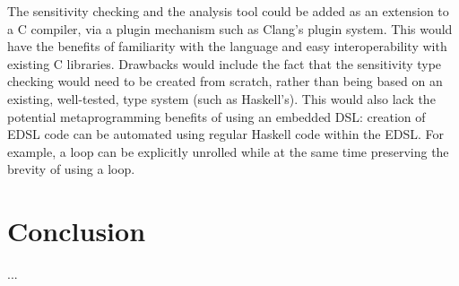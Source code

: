 \documentclass[10pt, conference]{IEEEtran}
\begin{document}
The sensitivity checking and the analysis tool could be added as an extension to
a C compiler, via a plugin mechanism such as Clang's plugin system. This would
have the benefits of familiarity with the language and easy interoperability
with existing C libraries. Drawbacks would include the fact that the sensitivity type
checking would need to be created from scratch, rather than being based on an existing, well-tested,
type system (such as Haskell's). This would also lack the potential metaprogramming
benefits of using an embedded DSL: creation of EDSL code can be automated using
regular Haskell code within the EDSL. For example, a loop can be explicitly unrolled while
at the same time preserving the brevity of using a loop.

\section{Conclusion}
...



\end{document}
